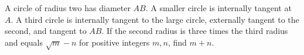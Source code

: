 A circle of radius two has diameter $AB$. A smaller circle is internally tangent at $A$. A third circle is internally tangent to the large circle, externally tangent to the second, and tangent to $AB$. If the second radius is three times the third radius and equals $\sqrt m-n$ for positive integers $m,n$, find $m+n$.

